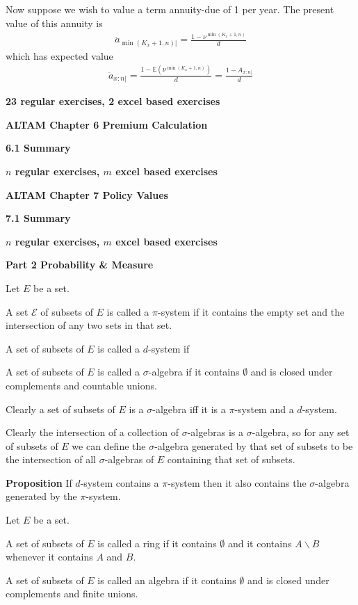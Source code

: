 \documentclass[hidelinks, 12pt]{article}
\theoremstyle{mydefstyle}
\theoremstyle{mythmstyle}
\begin{document}
Now suppose we wish to value a term annuity-due of 1 per year. The present value of this annuity is
\begin{gather*}
\ddot{a}_{\min(K_x+1, n)|} = \frac{1 - \nu^{\min(K_x+1, n)}}{d}
\end{gather*}
which has expected value
\begin{gather*}
\ddot{a}_{x:n|} = \frac{1 - \mathbb{E}(\nu^{\min(K_x+1, n)})}{d} = \frac{1 - A_{x:n|}}{d}
\end{gather*}

\textbf{23 regular exercises, 2 excel based exercises}

\textbf{ALTAM Chapter 6 Premium Calculation}

\textbf{6.1 Summary}

\textbf{$n$ regular exercises, $m$ excel based exercises}

\textbf{ALTAM Chapter 7 Policy Values}

\textbf{7.1 Summary}

\textbf{$n$ regular exercises, $m$ excel based exercises}

\textbf{Part 2 Probability \& Measure}

Let $E$ be a set. 

A set $\mathcal{E}$ of subsets of $E$ is called a $\pi$-system if it contains the empty set and the intersection of any two sets in that set. 

A set of subsets of $E$ is called a $d$-system if 

A set of subsets of $E$ is called a $\sigma$-algebra if it contains $\emptyset$ and is closed under complements and countable unions.

Clearly a set of subsets of $E$ is a $\sigma$-algebra iff it is a $\pi$-system and a $d$-system.

Clearly the intersection of a collection of $\sigma$-algebras is a $\sigma$-algebra, so for any set of subsets of $E$ we can define the $\sigma$-algebra generated by that set of subsets to be the intersection of all $\sigma$-algebras of $E$ containing that set of subsets. 

\textbf{Proposition} If $d$-system contains a $\pi$-system then it also contains the $\sigma$-algebra generated by the $\pi$-system. 

Let $E$ be a set.

A set of subsets of $E$ is called a ring if it contains $\emptyset$ and it contains $A\backslash B$ whenever it contains $A$ and $B$.

A set of subsets of $E$ is called an algebra if it contains $\emptyset$ and is closed under complements and finite unions.
\end{document}
